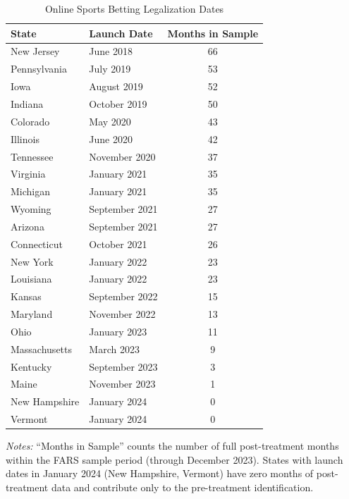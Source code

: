 \documentclass[12pt]{article}
\begin{document}
\begin{table}[H]
\centering
\caption{Online Sports Betting Legalization Dates}
\label{tab:treatment_dates_app}
\begin{threeparttable}
\begin{tabular}{llc}
\toprule
State & Launch Date & Months in Sample \\
\midrule
New Jersey & June 2018 & 66 \\
Pennsylvania & July 2019 & 53 \\
Iowa & August 2019 & 52 \\
Indiana & October 2019 & 50 \\
Colorado & May 2020 & 43 \\
Illinois & June 2020 & 42 \\
Tennessee & November 2020 & 37 \\
Virginia & January 2021 & 35 \\
Michigan & January 2021 & 35 \\
Wyoming & September 2021 & 27 \\
Arizona & September 2021 & 27 \\
Connecticut & October 2021 & 26 \\
New York & January 2022 & 23 \\
Louisiana & January 2022 & 23 \\
Kansas & September 2022 & 15 \\
Maryland & November 2022 & 13 \\
Ohio & January 2023 & 11 \\
Massachusetts & March 2023 & 9 \\
Kentucky & September 2023 & 3 \\
Maine & November 2023 & 1 \\
New Hampshire & January 2024 & 0 \\
Vermont & January 2024 & 0 \\
\bottomrule
\end{tabular}
\begin{tablenotes}[flushleft]
\small
\item \emph{Notes:} ``Months in Sample'' counts the number of full post-treatment months within the FARS sample period (through December 2023). States with launch dates in January 2024 (New Hampshire, Vermont) have zero months of post-treatment data and contribute only to the pre-treatment identification.
\end{tablenotes}
\end{threeparttable}
\end{table}
\end{document}
